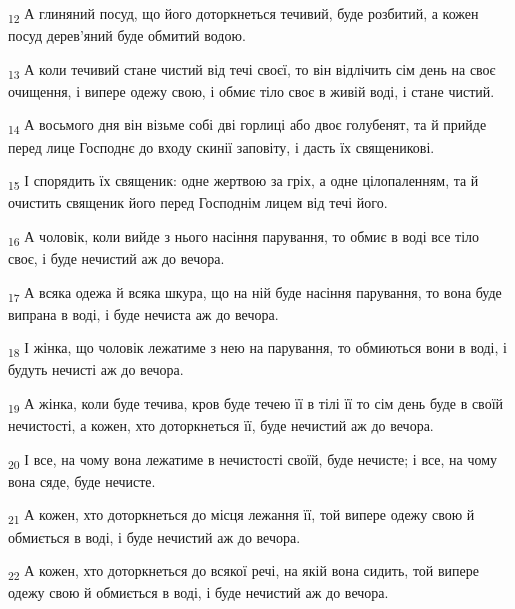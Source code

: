 \begin{tcolorbox}
\textsubscript{12} А глиняний посуд, що його доторкнеться течивий, буде розбитий, а кожен посуд дерев'яний буде обмитий водою.
\end{tcolorbox}
\begin{tcolorbox}
\textsubscript{13} А коли течивий стане чистий від течі своєї, то він відлічить сім день на своє очищення, і випере одежу свою, і обмиє тіло своє в живій воді, і стане чистий.
\end{tcolorbox}
\begin{tcolorbox}
\textsubscript{14} А восьмого дня він візьме собі дві горлиці або двоє голубенят, та й прийде перед лице Господнє до входу скинії заповіту, і дасть їх священикові.
\end{tcolorbox}
\begin{tcolorbox}
\textsubscript{15} І спорядить їх священик: одне жертвою за гріх, а одне цілопаленням, та й очистить священик його перед Господнім лицем від течі його.
\end{tcolorbox}
\begin{tcolorbox}
\textsubscript{16} А чоловік, коли вийде з нього насіння парування, то обмиє в воді все тіло своє, і буде нечистий аж до вечора.
\end{tcolorbox}
\begin{tcolorbox}
\textsubscript{17} А всяка одежа й всяка шкура, що на ній буде насіння парування, то вона буде випрана в воді, і буде нечиста аж до вечора.
\end{tcolorbox}
\begin{tcolorbox}
\textsubscript{18} І жінка, що чоловік лежатиме з нею на парування, то обмиються вони в воді, і будуть нечисті аж до вечора.
\end{tcolorbox}
\begin{tcolorbox}
\textsubscript{19} А жінка, коли буде течива, кров буде течею її в тілі її то сім день буде в своїй нечистості, а кожен, хто доторкнеться її, буде нечистий аж до вечора.
\end{tcolorbox}
\begin{tcolorbox}
\textsubscript{20} І все, на чому вона лежатиме в нечистості своїй, буде нечисте; і все, на чому вона сяде, буде нечисте.
\end{tcolorbox}
\begin{tcolorbox}
\textsubscript{21} А кожен, хто доторкнеться до місця лежання її, той випере одежу свою й обмиється в воді, і буде нечистий аж до вечора.
\end{tcolorbox}
\begin{tcolorbox}
\textsubscript{22} А кожен, хто доторкнеться до всякої речі, на якій вона сидить, той випере одежу свою й обмиється в воді, і буде нечистий аж до вечора.
\end{tcolorbox}
